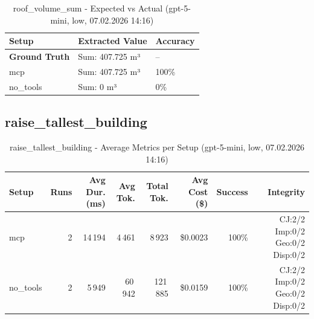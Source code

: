 \documentclass[a4paper,11pt]{article}
\begin{document}
\begin{table}[H]
\centering
\scriptsize
\caption{roof\_volume\_sum - Detailed Runs Comparison (gpt-5-mini, low, 07.02.2026 14:16)}
\end{table}

\begin{table}[H]
\centering
\scriptsize
\caption{roof\_volume\_sum - Expected vs Actual (gpt-5-mini, low, 07.02.2026 14:16)}
\begin{tabular}{l l l}
\toprule
Setup & Extracted Value & Accuracy \\
\midrule
\textbf{Ground Truth} & Sum: 407.725 m³ & -- \\
\midrule
mcp & Sum: 407.725 m³ & 100\% \\
no\_tools & Sum: 0 m³ & 0\% \\
\bottomrule
\end{tabular}
\end{table}

\clearpage

\subsection{raise\_tallest\_building}

\begin{table}[H]
\centering
\scriptsize
\caption{raise\_tallest\_building - Average Metrics per Setup (gpt-5-mini, low, 07.02.2026 14:16)}
\label{tab:combined\_raise\_tallest\_building\_metrics\_20260207}
\begin{tabular}{l r r r r r r r}
\toprule
Setup & Runs & Avg Dur. (ms) & Avg Tok. & Total Tok. & Avg Cost (\$) & Success & Integrity \\
\midrule
mcp & 2 & 14\,194 & 4\,461 & 8\,923 & \$0.0023 & 100\% & CJ:2/2 Imp:0/2 Geo:0/2 Disp:0/2 \\
no\_tools & 2 & 5\,949 & 60\,942 & 121\,885 & \$0.0159 & 100\% & CJ:2/2 Imp:0/2 Geo:0/2 Disp:0/2 \\
\bottomrule
\end{tabular}
\end{table}
\end{document}
